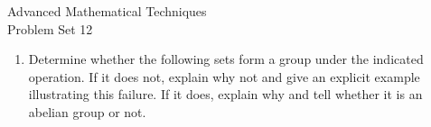 \documentclass{article}
\begin{document}
    \thispagestyle{fancy}
    \begin{center}
        \LARGE{Advanced Mathematical Techniques \\ Problem Set 12}
    \end{center}
    \vspace{10mm}
    \begin{enumerate}

        \item Determine whether the following sets form a group under the indicated operation. If it does not, explain why not and give an explicit example illustrating this failure. If it does, explain why and tell whether it is an abelian group or not.
        \begin{enumerate}


\end{enumerate}
\end{enumerate}
\end{document}
